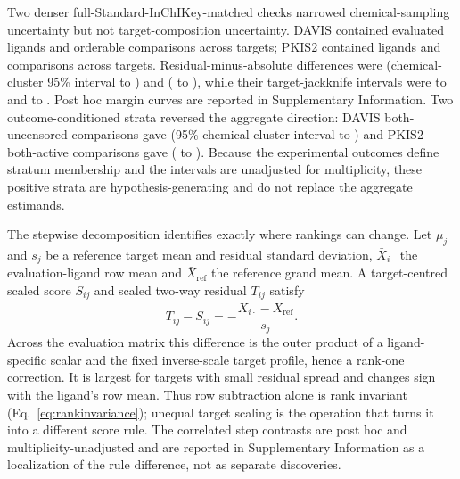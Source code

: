 \documentclass[11pt]{article}
\begin{document}
Two denser full-Standard-InChIKey-matched checks narrowed chemical-sampling uncertainty but
not target-composition uncertainty. DAVIS contained \DenseDavisEvaluatedLigands{} evaluated
ligands and \DenseDavisPairs{} orderable comparisons across \DenseDavisTargets{} targets;
PKIS2 contained \DensePkisTwoEvaluatedLigands{} ligands and \DensePkisTwoPairs{} comparisons
across \DensePkisTwoTargets{} targets. Residual-minus-absolute differences were
\DenseDavisDelta{} (chemical-cluster 95\% interval \DenseDavisDeltaLow{} to
\DenseDavisDeltaHigh{}) and \DensePkisTwoDelta{} (\DensePkisTwoDeltaLow{} to
\DensePkisTwoDeltaHigh{}), while their target-jackknife intervals were
\DenseDavisTargetJackknifeLow{} to \DenseDavisTargetJackknifeHigh{} and
\DensePkisTwoTargetJackknifeLow{} to \DensePkisTwoTargetJackknifeHigh{}. Post hoc margin
curves are reported in Supplementary Information. Two outcome-conditioned strata reversed
the aggregate direction: DAVIS both-uncensored comparisons gave
\DenseDavisBinderDelta{} (95\% chemical-cluster interval
\DenseDavisBinderDeltaLow{} to \DenseDavisBinderDeltaHigh{}) and PKIS2 both-active
comparisons gave \DensePkisTwoBothActiveDelta{}
(\DensePkisTwoBothActiveDeltaLow{} to \DensePkisTwoBothActiveDeltaHigh{}). Because the
experimental outcomes define stratum membership and the intervals are unadjusted for
multiplicity, these positive strata are hypothesis-generating and do not replace the
aggregate estimands.

The stepwise decomposition identifies exactly where rankings can change. Let $\mu_j$ and
$s_j$ be a reference target mean and residual standard deviation,
$\bar X_{i\cdot}$ the evaluation-ligand row mean and $\bar X_{\mathrm{ref}}$ the reference
grand mean. A target-centred scaled score $S_{ij}$ and scaled two-way residual $T_{ij}$
satisfy
\begin{equation}
T_{ij}-S_{ij}
=-\frac{\bar X_{i\cdot}-\bar X_{\mathrm{ref}}}{s_j}.
\label{eq:scalinginteraction}
\end{equation}
Across the evaluation matrix this difference is the outer product of a ligand-specific
scalar and the fixed inverse-scale target profile, hence a rank-one correction. It is largest
for targets with small residual spread and changes sign with the ligand's row mean. Thus row
subtraction alone is rank invariant (Eq.~\ref{eq:rankinvariance}); unequal target scaling is
the operation that turns it into a different score rule. The correlated step contrasts are
post hoc and multiplicity-unadjusted and are reported in Supplementary Information as a
localization of the rule difference, not as separate discoveries.
\end{document}
